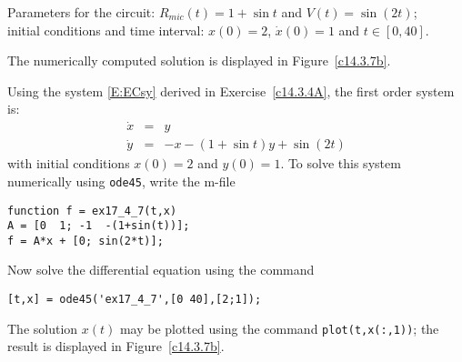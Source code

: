 \documentclass{ximera}
\begin{document}
\begin{computerExercise} \label{c14.3.7b}
Parameters for the circuit: $R_{mic}(t) = 1+\sin t$ and $V(t) = \sin(2t)$;\\
initial conditions and time interval: $x(0) = 2$, $\dot{x}(0) = 1$ and $t\in[0,40]$.

\begin{solution}
\ans The numerically computed solution is displayed in 
Figure~\ref{c14.3.7b}.

\soln  Using the system \eqref{E:ECsy} derived in 
Exercise~\ref{c14.3.4A}, the first order system is:
\begin{eqnarray*}
\dot{x} & = & y \\
\dot{y} & = & -x - (1+\sin t)y + \sin(2t)
\end{eqnarray*}
with initial conditions $x(0)=2$ and $y(0)=1$.  To solve this system numerically 
using {\tt ode45}, write the m-file
\begin{verbatim}
function f = ex17_4_7(t,x)
A = [0  1; -1  -(1+sin(t))];
f = A*x + [0; sin(2*t)];
\end{verbatim}
Now solve the differential equation using the command
\begin{verbatim}
[t,x] = ode45('ex17_4_7',[0 40],[2;1]);
\end{verbatim}
The solution $x(t)$ may be plotted using the command {\tt plot(t,x(:,1))}; the 
result is displayed in Figure~\ref{c14.3.7b}.
\begin{figure}[htb]
     \centerline{%
     }
\end{figure} 


\end{solution}
\end{computerExercise}
\end{document}
